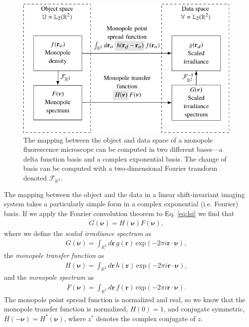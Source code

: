 \documentclass[]{osa-article}
\providecommand{\mb}[1]{\mathbf{#1}}
\providecommand{\mbb}[1]{\mathbb{#1}}
\providecommand{\bs}[1]{\boldsymbol{#1}}
\providecommand{\bv}{\bs{\nu}}
\begin{document}
\begin{figure}
  \centering
  \includegraphics[scale=1.0]{../figures/monopole-block/monopole-block.pdf}
  \caption{The mapping between the object and data space of a monopole
    fluorescence microscope can be computed in two different bases---a delta
    function basis and a complex exponential basis. The change of basis can be
    computed with a two-dimensional Fourier transform denoted
    $\mathcal{F}_{\mbb{R}^2}$.}
     \label{fig:monopole-block}      
\end{figure}

The mapping between the object and the data in a linear shift-invariant imaging
system takes a particularly simple form in a complex exponential (i.e. Fourier)
basis. If we apply the Fourier convolution theorem to Eq. \eqref{eq:lsi} we find
that
\begin{align}
  G(\bv) = H(\bv)F(\bv),\label{eq:freq}
\end{align}
where we define the \textit{scaled irradiance spectrum} as
\begin{align}
  G(\bv) = \int_{\mbb{R}^2}d\mb{r}\, g(\mb{r})\, \text{exp}(-2\pi i\mb{r}\cdot\bv),
\end{align}
the \textit{monopole transfer function} as
\begin{align}
  H(\bv) = \int_{\mbb{R}^2}d\mb{r}\, h(\mb{r})\, \text{exp}(-2\pi i\mb{r}\cdot\bv),\label{eq:otf}
\end{align}
and the \textit{monopole spectrum} as
\begin{align}
    F(\bv) = \int_{\mbb{R}^2}d\mb{r}\, f(\mb{r})\, \text{exp}(-2\pi i\mb{r}\cdot\bv).
\end{align}
The monopole point spread function is normalized and real, so we know that the
monopole transfer function is normalized, $H(0) = 1$, and conjugate symmetric,
$H(-\bv) = H^*(\bv)$, where $z^*$ denotes the complex conjugate of $z$.
\end{document}
